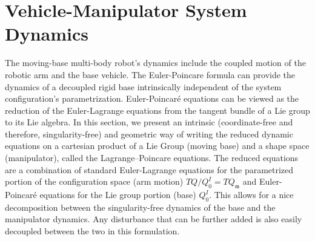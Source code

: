 \documentclass[lettersize,journal]{IEEEtran}
\begin{document}
\section{Vehicle-Manipulator System Dynamics}
\label{chap:Dynamics}
The moving-base multi-body robot's dynamics include the coupled motion of the robotic arm and the base vehicle. The Euler-Poincare formula can provide the dynamics of a decoupled rigid base intrinsically independent of the system configuration's parametrization. Euler-Poincaré equations can be viewed as the reduction of the Euler-Lagrange equations from the tangent bundle of a Lie group to its Lie algebra. In this section, we present an intrinsic (coordinate-free and therefore, singularity-free) and geometric way of writing the reduced dynamic equations on a cartesian product of a Lie Group (moving base) and a shape space (manipulator), called the Lagrange–Poincare equations. The reduced equations are a combination of standard Euler-Lagrange equations for the parametrized portion of the configuration space (arm motion) $T Q/Q^I_0=TQ_\mathfrak{m}$ and Euler-Poincaré equations for the Lie group portion (base) $Q^I_0$. This allows for a nice decomposition between the singularity-free dynamics of the base and the manipulator dynamics. Any disturbance that can be further added is also easily decoupled between the two in this formulation. %
\end{document}
